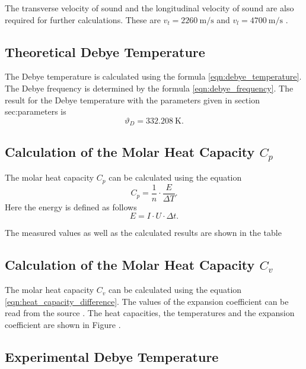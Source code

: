 The transverse velocity of sound and the longitudinal velocity of sound are also required for further calculations.
These are $v_t = \qty{2260}{\meter \per \second}$ and $v_l = \qty{4700}{\meter \per \second}$ \cite{molar_heat}.

\subsection{Theoretical Debye Temperature}
\label{sec:theoretical_debye_temperature}

The Debye temperature is calculated using the formula \ref{eqn:debye_temperature}.
The Debye frequency is determined by the formula \ref{eqn:debye_frequency}.
The result for the Debye temperature with the parameters given in section {sec:parameters} is
\begin{equation*}
	\vartheta_D = \qty{332.208}{\kelvin}.
\end{equation*}

\subsection{Calculation of the Molar Heat Capacity $C_p$}
\label{sec:calculation_of_the_molar_heat_capacity_cp}

The molar heat capacity $C_p$ can be calculated using the equation
\begin{equation}
	C_p = \frac{1}{n} \cdot \frac{E}{\Delta T}.
\end{equation}
Here the energy is defined as follows
\begin{equation}
	E = I \cdot U \cdot \Delta t.
\end{equation}

The measured values as well as the calculated results are shown in the table

\subsection{Calculation of the Molar Heat Capacity $C_v$}
\label{sec:calculation_of_the_molar_heat_capacity_cv}

The molar heat capacity $C_v$ can be calculated using the equation \ref{eqn:heat_capacity_difference}.
The values of the expansion coefficient can be read from the source \cite{molar_heat}.
The heat capacities, the temperatures and the expansion coefficient are shown in Figure .

\subsection{Experimental Debye Temperature}
\label{sec:experimental_debye_temperature}
